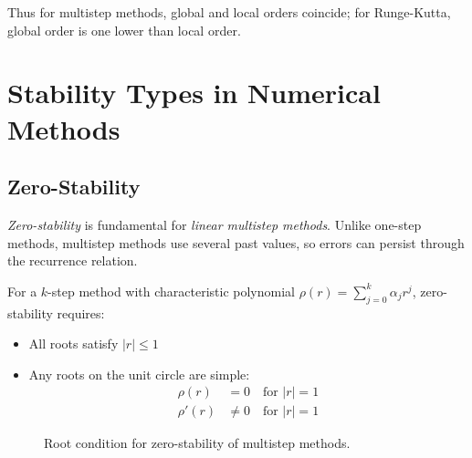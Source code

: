 Thus for multistep methods, global and local orders coincide; for Runge-Kutta, global order is one lower than local order.

\section{Stability Types in Numerical Methods}
\label{sec:stability-types}

\subsection{Zero-Stability}
\label{subsec:zero-stability}

\emph{Zero-stability} is fundamental for \emph{linear multistep methods}. Unlike one-step methods, multistep methods use several past values, so errors can persist through the recurrence relation.

For a $k$-step method with characteristic polynomial $\rho(r)=\sum_{j=0}^k\alpha_jr^j$, zero-stability requires:
\begin{itemize}
    \item All roots satisfy $|r|\le1$
    \item Any roots on the unit circle are simple:
    \begin{align*}
        \rho(r) &= 0 \quad \text{for } |r|=1 \\
        \rho'(r) &\neq 0 \quad \text{for } |r|=1
    \end{align*}
\end{itemize}

\begin{figure}[ht]
    \centering
    \caption{Root condition for zero-stability of multistep methods.}
    \label{fig:zero-stability}
\end{figure}

